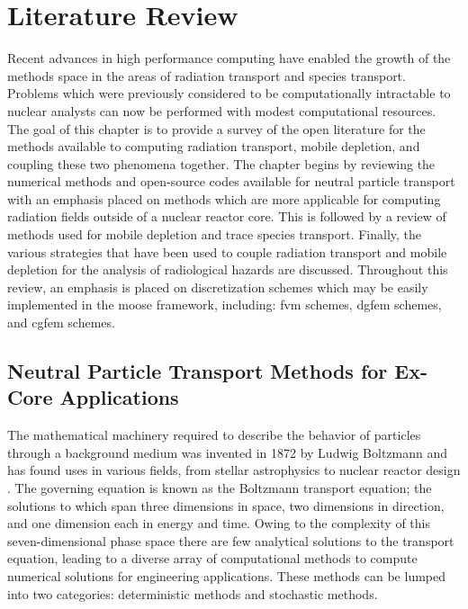\chapter{Literature Review} 
\label{lit_review}

Recent advances in high performance computing have enabled the growth of the methods space in the areas of radiation transport and species transport. Problems which were previously considered to be computationally intractable to nuclear analysts can now be performed with modest computational resources. The goal of this chapter is to provide a survey of the open literature for the methods available to computing radiation transport, mobile depletion, and coupling these two phenomena together. The chapter begins by reviewing the numerical methods and open-source codes available for neutral particle transport with an emphasis placed on methods which are more applicable for computing radiation fields outside of a nuclear reactor core. This is followed by a review of methods used for mobile depletion and trace species transport. Finally, the various strategies that have been used to couple radiation transport and mobile depletion for the analysis of radiological hazards are discussed. Throughout this review, an emphasis is placed on discretization schemes which may be easily implemented in the \acrshort{moose} framework, including: \acrfull{fvm} schemes, \acrfull{dgfem} schemes, and \acrfull{cgfem} schemes.

\section{Neutral Particle Transport Methods for Ex-Core Applications}
\label{lit_review:radiation_transport}

The mathematical machinery required to describe the behavior of particles through a background medium was invented in 1872 by Ludwig Boltzmann and has found uses in various fields, from stellar astrophysics to nuclear reactor design \cite{transport_theory}. The governing equation is known as the Boltzmann transport equation; the solutions to which span three dimensions in space, two dimensions in direction, and one dimension each in energy and time. Owing to the complexity of this seven-dimensional phase space there are few analytical solutions to the transport equation, leading to a diverse array of computational methods to compute numerical solutions for engineering applications. These methods can be lumped into two categories: deterministic methods and stochastic methods. 

